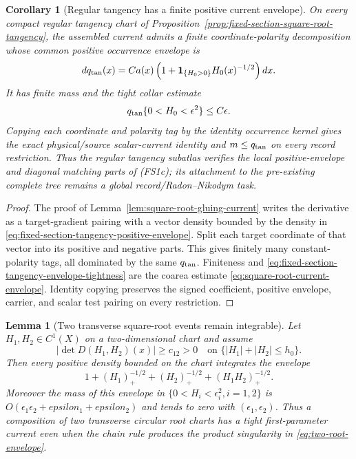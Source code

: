 \documentclass[11pt]{article}
\newtheorem{lemma}[theorem]{Lemma}
\newtheorem{corollary}[theorem]{Corollary}
\newcommand{\one}{\mathbf 1}
\begin{document}
\begin{corollary}[Regular tangency has a finite positive current envelope]
\label{cor:fixed-section-tangency-positive-envelope}
On every compact regular tangency chart of
Proposition~\ref{prop:fixed-section-square-root-tangency}, the assembled
current admits a finite coordinate-polarity decomposition whose common
positive occurrence envelope is
\begin{equation}
\label{eq:fixed-section-tangency-positive-envelope}
 dq_{\rm tan}(x)=Ca(x)
 \left(1+\one_{\{H_0>0\}}H_0(x)^{-1/2}\right)dx.
\end{equation}
It has finite mass and the tight collar estimate
\begin{equation}
\label{eq:fixed-section-tangency-envelope-tightness}
 q_{\rm tan}\{0<H_0<\epsilon^2\}\le C\epsilon.
\end{equation}
Copying each coordinate and polarity tag by the identity occurrence kernel
gives the exact physical/source scalar-current identity and $m\le q_{\rm tan}$
on every record restriction.  Thus the regular tangency subatlas verifies
the local positive-envelope and diagonal matching parts of
\textup{(FS1c)}; its attachment to the pre-existing complete tree remains a
global record/Radon--Nikodym task.
\end{corollary}

\begin{proof}
The proof of Lemma~\ref{lem:square-root-gluing-current} writes the derivative
as a target-gradient pairing with a vector density bounded by the density in
\eqref{eq:fixed-section-tangency-positive-envelope}.  Split each target
coordinate of that vector into its positive and negative parts.  This gives
finitely many constant-polarity tags, all dominated by the same $q_{\rm tan}$.
Finiteness and \eqref{eq:fixed-section-tangency-envelope-tightness} are the
coarea estimate \eqref{eq:square-root-current-envelope}.  Identity copying
preserves the signed coefficient, positive envelope, carrier, and scalar
test pairing on every restriction.
\end{proof}

\begin{lemma}[Two transverse square-root events remain integrable]
\label{lem:two-root-integrability}
Let $H_1,H_2\in C^1(X)$ on a two-dimensional chart and assume
\begin{equation}
\label{eq:two-root-transversality}
 |\det D(H_1,H_2)(x)|\ge c_{12}>0
 \quad\text{on }\{|H_1|+|H_2|\le h_0\}.
\end{equation}
Then every positive density bounded on the chart integrates the envelope
\begin{equation}
\label{eq:two-root-envelope}
 1+(H_1)_+^{-1/2}+(H_2)_+^{-1/2}
   +(H_1H_2)_+^{-1/2}.
\end{equation}
Moreover the mass of this envelope in
$\{0<H_i<\epsilon_i^2, i=1,2\}$ is $O(\epsilon_1\epsilon_2+epsilon_1+epsilon_2)$
and tends to zero with $(\epsilon_1,\epsilon_2)$.  Thus a composition of two
transverse circular root charts has a tight first-parameter current even
when the chain rule produces the product singularity in
\eqref{eq:two-root-envelope}.
\end{lemma}
\end{document}
